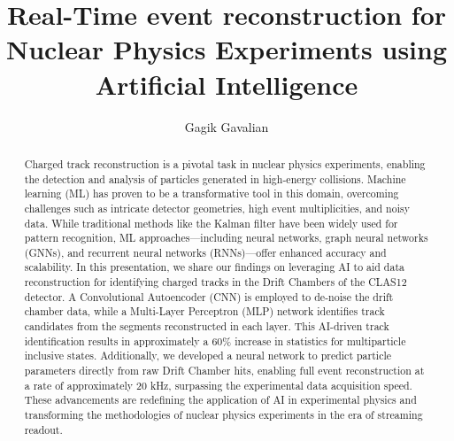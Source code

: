 \documentclass[preprint,12pt]{elsarticle}
\title{Real-Time event reconstruction for Nuclear Physics Experiments using Artificial Intelligence}
\author[1]{Gagik Gavalian}
\begin{document}

\begin{abstract}
\indent
Charged track reconstruction is a pivotal task in nuclear physics experiments, enabling the detection and analysis of particles generated in high-energy collisions. Machine learning (ML) has proven to be a transformative tool in this domain, overcoming challenges such as intricate detector geometries, high event multiplicities, and noisy data. While traditional methods like the Kalman filter have been widely used for pattern recognition, ML approaches—including neural networks, graph neural networks (GNNs), and recurrent neural networks (RNNs)—offer enhanced accuracy and scalability.
In this presentation, we share our findings on leveraging AI to aid data reconstruction for identifying charged tracks in the Drift Chambers of the CLAS12 detector. A Convolutional Autoencoder (CNN) is employed to de-noise the drift chamber data, while a Multi-Layer Perceptron (MLP) network identifies track candidates from the segments reconstructed in each layer. This AI-driven track identification results in approximately a $60\%$ increase in statistics for multiparticle inclusive states. Additionally, we developed a neural network to predict particle parameters directly from raw Drift Chamber hits, enabling full event reconstruction at a rate of approximately 20 kHz, surpassing the experimental data acquisition speed. These advancements are redefining the application of AI in experimental physics and transforming the methodologies of nuclear physics experiments in the era of streaming readout.



\end{abstract}
\end{document}
